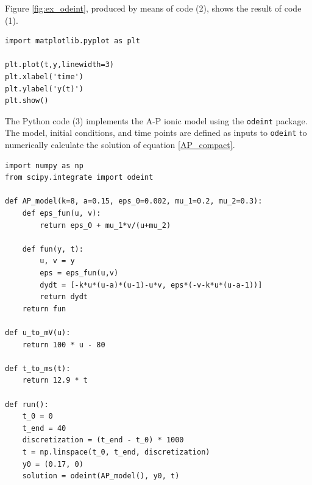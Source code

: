 \documentclass[11pt,a4paper]{article}
\begin{document}
Figure \ref{fig:ex_odeint}, produced by means of code (2), shows the result of code (1).

\lstset{language=Python}
\lstset{frame=lines}
\lstset{basicstyle=\footnotesize}
\begin{lstlisting}
import matplotlib.pyplot as plt

plt.plot(t,y,linewidth=3)
plt.xlabel('time')
plt.ylabel('y(t)')
plt.show()
\end{lstlisting}
\newpage

The Python code (3) implements the A-P ionic model using the \verb|odeint| package. The model, initial conditions, and time points are defined as inputs to \verb|odeint| to numerically calculate the solution of equation \eqref{AP_compact}.

\lstset{language=Python}
\lstset{frame=lines}
\lstset{basicstyle=\footnotesize}
\begin{lstlisting}
import numpy as np  
from scipy.integrate import odeint 

def AP_model(k=8, a=0.15, eps_0=0.002, mu_1=0.2, mu_2=0.3):
	def eps_fun(u, v):
		return eps_0 + mu_1*v/(u+mu_2)

	def fun(y, t):
		u, v = y
		eps = eps_fun(u,v)
		dydt = [-k*u*(u-a)*(u-1)-u*v, eps*(-v-k*u*(u-a-1))]
		return dydt
	return fun

def u_to_mV(u):
	return 100 * u - 80

def t_to_ms(t):
	return 12.9 * t

def run():
	t_0 = 0
	t_end = 40
	discretization = (t_end - t_0) * 1000
	t = np.linspace(t_0, t_end, discretization)
	y0 = (0.17, 0)
	solution = odeint(AP_model(), y0, t)
\end{lstlisting}
\end{document}
